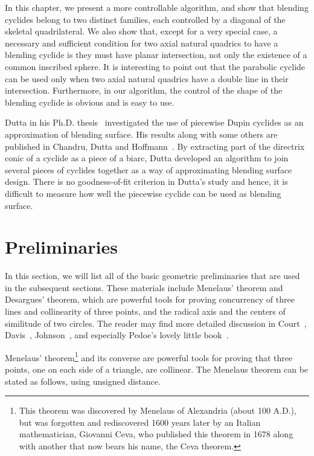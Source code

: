      In this chapter, we present a more controllable algorithm, and show that 
blending cyclides belong to two distinct families, each controlled by a 
diagonal of the skeletal quadrilateral.  We also show that, except for a very
special case,  a necessary and
sufficient condition for two axial natural quadrics to have a blending
cyclide is they must have planar intersection, not only the existence of a
common inscribed sphere.  It is interesting to point out that the parabolic
cyclide can be used only when two axial natural quadrics have a double line
in their intersection.  Furthermore, in our algorithm, the control of the 
shape of the blending cyclide is obvious and is easy to use.

     Dutta in his Ph.D. thesis~\cite{dutta:1989} investigated the
use of piecewise Dupin cyclides as an 
approximation of blending surface.  His results along with some others are 
published in Chandru, Dutta and
Hoffmann~\cite{chandru-dutta-hoffmann:1989,chandru-dutta-hoffmann:1990}.
By extracting part of the directrix
conic of a cyclide as a piece of a biarc, Dutta developed an algorithm to 
join several pieces of cyclides together as a way of 
approximating blending surface design.  There is no goodness-of-fit 
criterion in Dutta's study and hence, it is difficult to measure how well the 
piecewise cyclide can be used as blending surface.  

\section{Preliminaries}
\label{section:prelim}

     In this section, we will list all of the basic geometric preliminaries
that are used in the subsequent sections.  These materials include Menelaus' 
theorem and Desargues' theorem, which are powerful tools for proving 
concurrency of three lines and collinearity of three points,  
and the radical axis and the centers of similitude of two circles.
The reader may find more detailed discussion in 
Court~\cite{court:1925},
Davis~\cite{davis:1949}, 
Johnson~\cite{johnson:1929}, and especially Pedoe's
lovely little book~\cite{pedoe:1957}.

     Menelaus' theorem\footnote{This theorem was discovered by Menelaus of
Alexandria (about 100 A.D.), 
but was forgotten and rediscovered 1600 years later by an Italian 
mathematician, Giovanni Ceva, who published
this theorem in 1678 along with another that now bears his name,
the Ceva theorem.} 
and its converse are powerful tools for proving that three points, one on each 
side of a triangle, are collinear.  The Menelaus theorem can be stated as 
follows, using unsigned distance.


